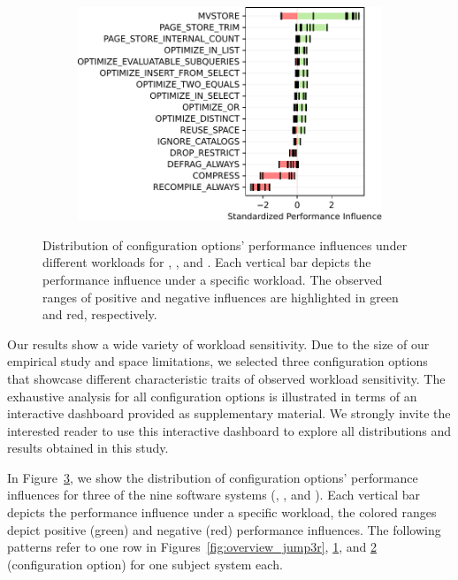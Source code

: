 {{{\begin{figure}
\begin{subfigure}{0.3\linewidth}
		\caption{\zdrei}
		\label{fig:overview_z3}
	\end{subfigure}
	\begin{subfigure}{0.4\linewidth}
		\centering
		\includegraphics[width=\linewidth]{images/h2.pdf}
		\caption{\htwo}
		\label{fig:overview_h2}
	\end{subfigure}
	
	\caption{Distribution of configuration options' performance influences under different workloads for \jumper, \zdrei, and \htwo. Each vertical bar depicts the performance influence under a specific workload. The observed ranges of positive and negative influences are highlighted in green and red, respectively.}
	\label{fig:three_systems}
\end{figure}
	
Our results show a wide variety of workload sensitivity. Due to the size of our empirical study and space limitations, we selected three configuration options that showcase different characteristic traits of observed workload sensitivity. The exhaustive analysis for all configuration options is illustrated in terms of an interactive dashboard provided as supplementary material. We strongly invite the interested reader to use this interactive dashboard to explore all distributions and results obtained in this study.

{In Figure~\ref{fig:three_systems}, we show the distribution of configuration options' performance influences for three of the nine software systems (\jumper, \zdrei, and \htwo). {\color{black}Each vertical bar depicts the performance influence under a specific workload, the colored ranges depict positive (green) and negative (red) performance influences. The following patterns refer to one row in Figures~\ref{fig:overview_jump3r}, \ref{fig:overview_z3}, and \ref{fig:overview_h2} (configuration option) for one subject system each.}

}}}}
